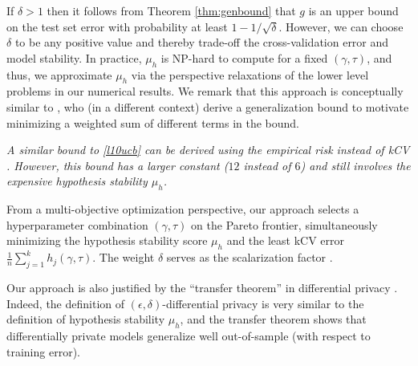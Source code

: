 \documentclass[mnsc,nonblindrev]{informs3} %
\begin{document}
{{If $\delta>1$ then it follows from Theorem \ref{thm:genbound} that $g$ is an upper bound on the test set error with probability at least $1-1/\sqrt{\delta}$. However, we can choose $\delta$ to be any positive value and thereby trade-off the cross-validation error and model stability. In practice, $\mu_h$ is NP-hard to compute for a fixed $(\gamma, \tau)$, and thus, we approximate $\mu_h$ via the perspective relaxations \citep{atamturk2020safe} of the lower level problems in our numerical results. We remark that this approach is conceptually similar to \cite{johansson2022generalization}, who (in a different context) derive a generalization bound to motivate minimizing a weighted sum of different terms in the bound.

 \begin{remark}\textit{
A similar bound to \eqref{l10ucb} can be derived using the empirical risk instead of kCV \citep[Theorem 11]{bousquet2002stability}. However, this bound has a larger constant ($12$ instead of $6$) and still involves the expensive hypothesis stability $\mu_h$. } 
\end{remark}

From a multi-objective optimization perspective, our approach selects a hyperparameter combination $(\gamma, \tau)$ on the Pareto frontier, simultaneously minimizing the hypothesis stability score $\mu_h$ and the least kCV error $\frac{1}{n}\sum_{j=1}^k h_j(\gamma, \tau)$. The weight $\delta$ serves as the scalarization factor \citep[see][for a general theory of multi-objective optimization]{ehrgott2005multicriteria}. 

Our approach is also justified by the ``transfer theorem'' in differential privacy \citep[][]{jung2019new}. Indeed, the definition of $(\epsilon, \delta)$-differential privacy \citep[see][]{dwork2006calibrating} is very similar to the definition of hypothesis stability $\mu_h$, and the transfer theorem \citep[][Lemma 3.4]{jung2019new} shows that differentially private models generalize well out-of-sample (with respect to training error). %


}}
\end{document}
